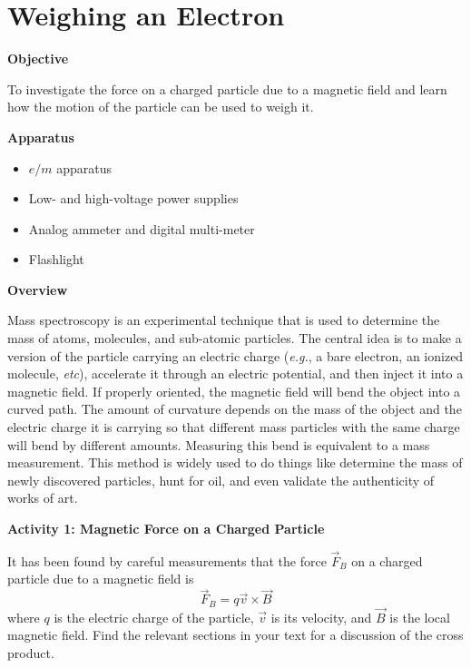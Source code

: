 \setcounter{equation}{0}
\setcounter{figure}{0}

\section{Weighing an Electron}

\makelabheader %

\textbf{Objective}

To investigate the force on a charged particle due to a magnetic field and 
learn how the motion of the particle can be used to weigh it.

\textbf{Apparatus}

\begin{itemize}

\item $e/m$ apparatus

\item Low- and high-voltage power supplies

\item Analog ammeter and digital multi-meter

\item Flashlight

\end{itemize}

\textbf{Overview}

Mass spectroscopy is an experimental technique that is used to determine
the mass of atoms, molecules, and sub-atomic particles.
The central idea is to make a version of the particle carrying an electric
charge ({\it e.g.}, a bare electron, an ionized molecule, {\it etc}), accelerate it
through an electric potential, and then inject it into a magnetic field.
If properly oriented, the magnetic field will bend the object into
a curved path.
The amount of curvature depends on the mass of the object and the electric
charge it is carrying so that different mass particles with the same charge will
bend by different amounts.
Measuring this bend is equivalent to a mass measurement.
This method is widely used to do things like determine the mass of newly discovered particles,
hunt for oil, and even validate the authenticity of works of art.

\textbf{Activity 1: Magnetic Force on a Charged Particle}

It has been found by careful measurements that the force $\vec F_B$ on a charged
particle due to a magnetic field is
\begin{equation}
\vec F_B = q \vec v \times \vec B
\end{equation}
where $q$ is the electric charge of the particle, $\vec v$ is its velocity,
and $\vec B$ is the local magnetic field.
Find the relevant sections in your text for a discussion of the cross product.

